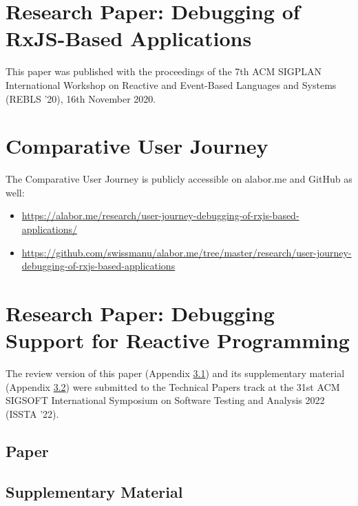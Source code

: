 \section{Research Paper: Debugging of RxJS-Based Applications}
\label{sec:paper-1}

This paper was published with the proceedings of the 7th ACM SIGPLAN International Workshop
on Reactive and Event-Based Languages and Systems (REBLS '20), 16th November 2020.




\section{Comparative User Journey}
\label{sec:user-journey}

The Comparative User Journey is publicly accessible on alabor.me and GitHub as well:

\begin{itemize}
  \item \url{https://alabor.me/research/user-journey-debugging-of-rxjs-based-applications/}
  \item \url{https://github.com/swissmanu/alabor.me/tree/master/research/user-journey-debugging-of-rxjs-based-applications}
\end{itemize}







\section{Research Paper: Debugging Support for Reactive Programming}
\label{sec:paper-2}

The review version of this paper (Appendix \ref{sec:paper-2-paper}) and its supplementary material
(Appendix \ref{sec:paper-2-supplementary}) were submitted to the Technical Papers track at the 31st ACM SIGSOFT
International Symposium on Software Testing and Analysis 2022 (ISSTA '22).

\subsection{Paper}
\label{sec:paper-2-paper}


\subsection{Supplementary Material}
\label{sec:paper-2-supplementary}







